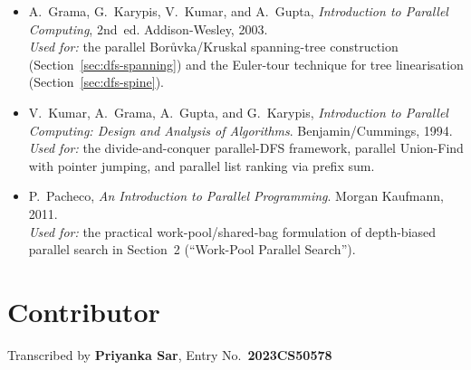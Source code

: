 \begin{itemize}
  \item A.~Grama, G.~Karypis, V.~Kumar, and A.~Gupta,
        \emph{Introduction to Parallel Computing}, 2nd~ed.
        Addison-Wesley, 2003.~\cite{grama2003}
        \\ \emph{Used for:} the parallel
        Bor{\r u}vka/Kruskal spanning-tree construction
        (Section~\ref{sec:dfs-spanning}) and the Euler-tour technique
        for tree linearisation (Section~\ref{sec:dfs-spine}).
  \item V.~Kumar, A.~Grama, A.~Gupta, and G.~Karypis,
        \emph{Introduction to Parallel Computing: Design and Analysis
        of Algorithms}.
        Benjamin/Cummings, 1994.~\cite{kumar1994}
        \\ \emph{Used for:} the divide-and-conquer parallel-DFS
        framework, parallel Union-Find with pointer jumping, and
        parallel list ranking via prefix sum.
  \item P.~Pacheco, \emph{An Introduction to Parallel Programming}.
        Morgan Kaufmann, 2011.~\cite{pacheco2011}
        \\ \emph{Used for:} the practical work-pool/shared-bag
        formulation of depth-biased parallel search in
        Section~2 (``Work-Pool Parallel Search'').
\end{itemize}

\section*{Contributor}

\begin{ppnote}
Transcribed by \textbf{Priyanka Sar}, Entry No.\ \textbf{2023CS50578}
\end{ppnote}